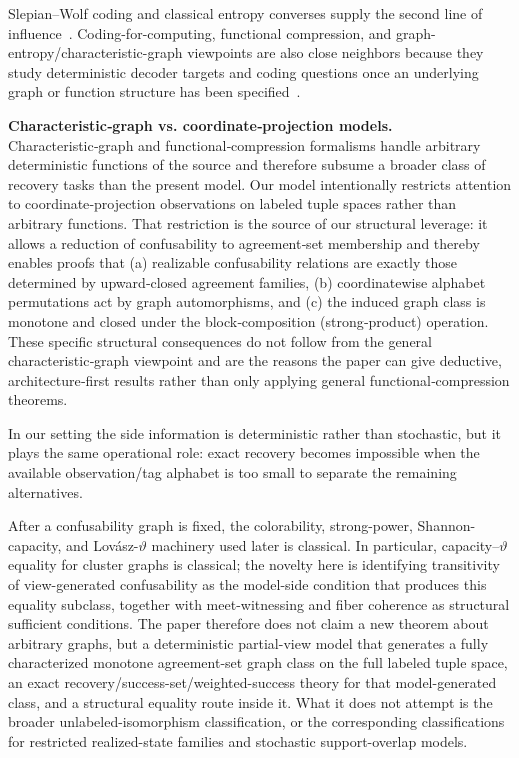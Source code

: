 Slepian--Wolf coding and classical entropy converses supply the second line of influence~\cite{slepian1973noiseless,fano1961transmission,witsenhausen1975conditional,cover2006elements}. Coding-for-computing, functional compression, and graph-entropy/characteristic-graph viewpoints are also close neighbors because they study deterministic decoder targets and coding questions once an underlying graph or function structure has been specified~\cite{orlitsky2001coding,doshi2010functional,korner1973graphs}.

\medskip
\noindent\textbf{Characteristic‑graph vs. coordinate‑projection models.} Characteristic‑graph and functional‑compression formalisms handle arbitrary deterministic functions of the source and therefore subsume a broader class of recovery tasks than the present model. Our model intentionally restricts attention to coordinate‑projection observations on labeled tuple spaces rather than arbitrary functions. That restriction is the source of our structural leverage: it allows a reduction of confusability to agreement‑set membership and thereby enables proofs that (a) realizable confusability relations are exactly those determined by upward‑closed agreement families, (b) coordinatewise alphabet permutations act by graph automorphisms, and (c) the induced graph class is monotone and closed under the block‑composition (strong‑product) operation. These specific structural consequences do not follow from the general characteristic‑graph viewpoint and are the reasons the paper can give deductive, architecture‑first results rather than only applying general functional‑compression theorems.

In our setting the side information is deterministic rather than stochastic, but it plays the same operational role: exact recovery becomes impossible when the available observation/tag alphabet is too small to separate the remaining alternatives.

After a confusability graph is fixed, the colorability, strong-power, Shannon-capacity, and Lov\'asz-$\vartheta$ machinery used later is classical. In particular, capacity--$\vartheta$ equality for cluster graphs is classical; the novelty here is identifying transitivity of view-generated confusability as the model-side condition that produces this equality subclass, together with meet-witnessing and fiber coherence as structural sufficient conditions. The paper therefore does not claim a new theorem about arbitrary graphs, but a deterministic partial-view model that generates a fully characterized monotone agreement-set graph class on the full labeled tuple space, an exact recovery/success-set/weighted-success theory for that model-generated class, and a structural equality route inside it. What it does not attempt is the broader unlabeled-isomorphism classification, or the corresponding classifications for restricted realized-state families and stochastic support-overlap models.

